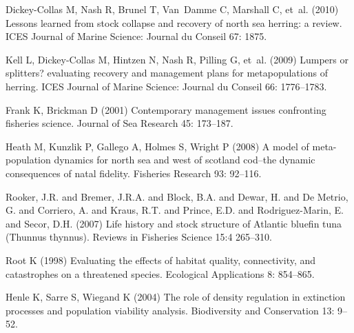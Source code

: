 \documentclass{pnastwo}
\begin{document}
\begin{article}
\begin{thebibliography}{10}
Dickey-Collas M, Nash R, Brunel T, Van~Damme C, Marshall C, et~al. (2010)
  Lessons learned from stock collapse and recovery of north sea herring: a
  review.
ICES Journal of Marine Science: Journal du Conseil 67: 1875.

Kell L, Dickey-Collas M, Hintzen N, Nash R, Pilling G, et~al. (2009) Lumpers or
  splitters? evaluating recovery and management plans for metapopulations of
  herring.
ICES Journal of Marine Science: Journal du Conseil 66: 1776--1783.

Frank K, Brickman D (2001) Contemporary management issues confronting fisheries
  science.
Journal of Sea Research 45: 173--187.

Heath M, Kunzlik P, Gallego A, Holmes S, Wright P (2008) A model of
  meta-population dynamics for north sea and west of scotland cod--the dynamic
  consequences of natal fidelity.
Fisheries Research 93: 92--116.



  Rooker, J.R. and Bremer, J.R.A. and Block, B.A. and Dewar, H. and De Metrio, G. and Corriero, A. 
   and Kraus, R.T. and Prince, E.D. and Rodriguez-Marin, E. and Secor, D.H. (2007)
  Life history and stock structure of Atlantic bluefin tuna (Thunnus thynnus).
Reviews in Fisheries Science 15:4 265--310.

Root K (1998) Evaluating the effects of habitat quality, connectivity, and
  catastrophes on a threatened species.
Ecological Applications 8: 854--865.


Henle K, Sarre S, Wiegand K (2004) The role of density regulation in extinction
  processes and population viability analysis.
Biodiversity and Conservation 13: 9--52.


\end{thebibliography}

\end{article}


\end{document}
